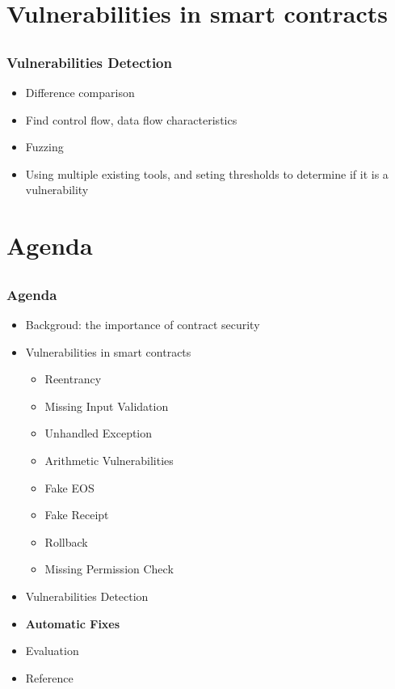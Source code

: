 \documentclass[notheorems, aspectratio=54]{beamer}
\begin{document}

\section{Vulnerabilities in smart contracts}
\subsection{}
\begin{frame}
    \frametitle{Vulnerabilities Detection}

    \begin{itemize}
        \item Difference comparison
        \item Find control flow, data flow characteristics
        \item Fuzzing
        \item Using multiple existing tools, and seting thresholds to determine if it is a vulnerability
    \end{itemize}

\end{frame}


\section{Agenda}
\subsection{}
\begin{frame}
    \frametitle{Agenda}

    \begin{itemize}
        \item Backgroud: the importance of contract security
        \item Vulnerabilities in smart contracts
        \begin{itemize}
            \item Reentrancy
            \item Missing Input Validation
            \item Unhandled Exception
            \item Arithmetic Vulnerabilities
            \item Fake EOS
            \item Fake Receipt
            \item Rollback
            \item Missing Permission Check
        \end{itemize}
        \item Vulnerabilities Detection
        \item \textbf{Automatic Fixes}
        \item Evaluation
        \item Reference
    \end{itemize}
    
\end{frame}
\end{document}
